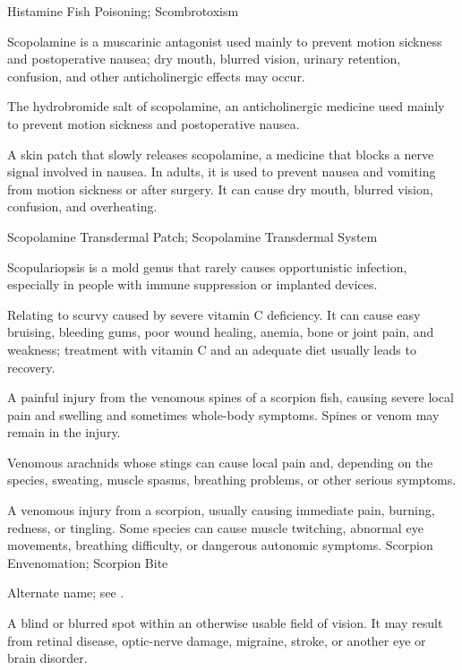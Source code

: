 \synonyms
Histamine Fish Poisoning; Scombrotoxism

 Scopolamine is a muscarinic antagonist used mainly to prevent motion sickness and postoperative nausea; dry mouth, blurred vision, urinary retention, confusion, and other anticholinergic effects may occur.

 The hydrobromide salt of scopolamine, an anticholinergic medicine used mainly to prevent motion sickness and postoperative nausea.

 A skin patch that slowly releases scopolamine, a
medicine that blocks a nerve signal involved in nausea. In adults, it is used
to prevent nausea and vomiting from motion sickness or after surgery. It can
cause dry mouth, blurred vision, confusion, and overheating.

\synonyms
Scopolamine Transdermal Patch; Scopolamine Transdermal System

 Scopulariopsis is a mold genus that rarely causes opportunistic infection, especially in people with immune suppression or implanted devices.

 Relating to scurvy caused by severe vitamin C deficiency. It can cause easy bruising, bleeding gums, poor wound healing, anemia, bone or joint pain, and weakness; treatment with vitamin C and an adequate diet usually leads to recovery.

 A painful injury from the venomous spines of a scorpion fish, causing severe local pain and swelling and sometimes whole-body symptoms. Spines or venom may remain in the injury.

 Venomous arachnids whose stings can cause local pain and, depending on the species, sweating, muscle spasms, breathing problems, or other serious symptoms.

 A venomous injury from a scorpion, usually causing immediate pain, burning, redness, or tingling. Some species can cause muscle twitching, abnormal eye movements, breathing difficulty, or dangerous autonomic symptoms.
\synonyms
Scorpion Envenomation; Scorpion Bite

 Alternate name; see .

 A blind or blurred spot within an otherwise usable field of vision. It may result from retinal disease, optic-nerve damage, migraine, stroke, or another eye or brain disorder.

